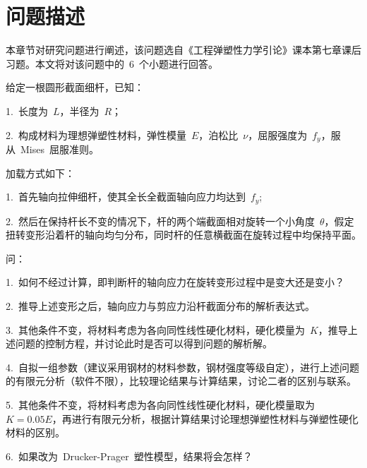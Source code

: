 \chapter{问题描述}
\label{cha:Description}
本章节对研究问题进行阐述，该问题选自《工程弹塑性力学引论》课本第七章课后习题。本文将对该问题中的~6~个小题进行回答。

给定一根圆形截面细杆，已知： 

1.~长度为~{$L$}，半径为~{$R$}； 

2.~构成材料为理想弹塑性材料，弹性模量~{$E$}，泊松比~{$\nu$}，屈服强度为~{$f_y$}，服从~Mises~屈服准则。 

加载方式如下： 

1.~首先轴向拉伸细杆，使其全长全截面轴向应力均达到~{$f_y$}; 

2.~然后在保持杆长不变的情况下，杆的两个端截面相对旋转一个小角度~{$\theta$}，假定扭转变形沿着杆的轴向均匀分布，同时杆的任意横截面在旋转过程中均保持平面。 

问：
 
1.~如何不经过计算，即判断杆的轴向应力在旋转变形过程中是变大还是变小？ 

2.~推导上述变形之后，轴向应力与剪应力沿杆截面分布的解析表达式。

3.~其他条件不变，将材料考虑为各向同性线性硬化材料，硬化模量为~{$K$}，推导上述问题的控制方程，并讨论此时是否可以得到问题的解析解。

4.~自拟一组参数（建议采用钢材的材料参数，钢材强度等级自定），进行上述问题的有限元分析（软件不限），比较理论结果与计算结果，讨论二者的区别与联系。 

5.~其他条件不变，将材料考虑为各向同性线性硬化材料，硬化模量取为~{$K=0.05E$}，再进行有限元分析，根据计算结果讨论理想弹塑性材料与弹塑性硬化材料的区别。 

6.~如果改为~Drucker-Prager~塑性模型，结果将会怎样？